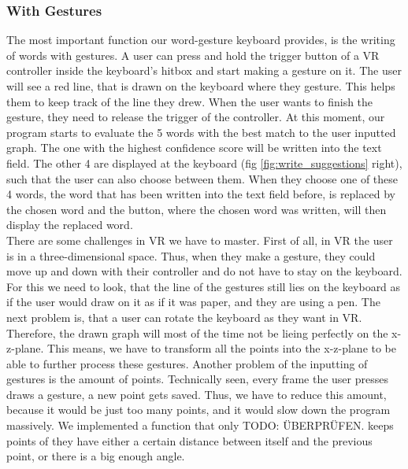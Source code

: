 \subsubsection{With Gestures}
The most important function our word-gesture keyboard provides, is the writing of words with gestures. A user can press and hold the trigger button of a VR controller inside the keyboard's hitbox and start making a gesture on it. The user will see a red line, that is drawn on the keyboard where they gesture. This helps them to keep track of the line they drew. When the user wants to finish the gesture, they need to release the trigger of the controller. At this moment, our program starts to evaluate the 5 words with the best match to the user inputted graph. The one with the highest confidence score will be written into the text field. The other 4 are displayed at the keyboard (fig \ref{fig:write_suggestions} right), such that the user can also choose between them. When they choose one of these 4 words, the word that has been written into the text field before, is replaced by the chosen word and the button, where the chosen word was written, will then display the replaced word.\\
There are some challenges in VR we have to master. First of all, in VR the user is in a three-dimensional space. Thus, when they make a gesture, they could move up and down with their controller and do not have to stay on the keyboard. For this we need to look, that the line of the gestures still lies on the keyboard as if the user would draw on it as if it was paper, and they are using a pen. The next problem is, that a user can rotate the keyboard as they want in VR. Therefore, the drawn graph will most of the time not be lieing perfectly on the x-z-plane. This means, we have to transform all the points into the x-z-plane to be able to further process these gestures. Another problem of the inputting of gestures is the amount of points. Technically seen, every frame the user presses draws a gesture, a new point gets saved. Thus, we have to reduce this amount, because it would be just too many points, and it would slow down the program massively. We implemented a function that only TODO: ÜBERPRÜFEN. keeps points of they have either a certain distance between itself and the previous point, or there is a big enough angle.

